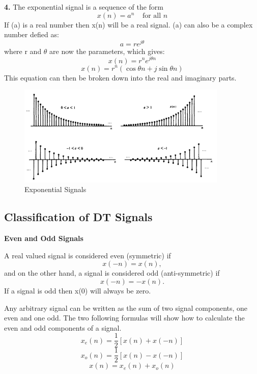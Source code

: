 \documentclass{article} %
\begin{document}
	\textbf{4.} The exponential signal is a sequence of the form
	\begin{equation}
 	 x(n) = a^n \;\;\;\; \text{for all } n
	\end{equation}
	If (a) is a real number then x(n) will be a real signal. (a) can also be a complex number defied as:
	\begin{equation}
 	a = re^{j\theta}
	\end{equation}
	where r and $\theta$ are now the parameters, which gives:
	\begin{equation}
 	 x(n) = r^ne^{j\theta n}
	\end{equation}
	\begin{equation}
 	 x(n) = r^n(\cos \theta n + j\sin \theta n)
	\end{equation}
	This equation can then be broken down into the real and imaginary parts.
	\begin{figure}[h]
    \centering
	\includegraphics[width=10cm]{exp}
	\caption{Exponential Signals}
	\end{figure}
	
	\subsection{Classification of DT Signals}
	\textbf{Even and Odd Signals}
	
	A real valued signal is considered even (symmetric) if
	\begin{equation}
 	 x(-n) = x(n),
	\end{equation}
	and on the other hand, a signal is considered odd (anti-symmetric) if
	\begin{equation}
 	 x(-n) = -x(n).
	\end{equation}
	If a signal is odd then x(0) will always be zero. 
	
	Any arbitrary signal can be written as the sum of two signal components, one even and one odd. The two following formulas will show how to calculate the even and odd components of a signal.
	\begin{equation}
 	 x_e(n) = \frac{1}{2} [x(n) + x(-n)]
	\end{equation}
	\begin{equation}
 	 x_o(n) = \frac{1}{2} [x(n) - x(-n)]
	\end{equation}
	\begin{equation}
 	 x(n) = x_e(n) + x_o(n)
	\end{equation}
	
\end{document}
